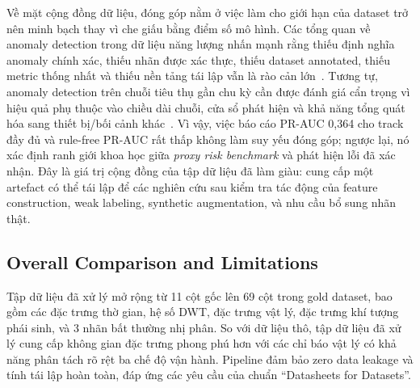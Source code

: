 \documentclass[conference]{IEEEtran}
\begin{document}
Về mặt cộng đồng dữ liệu, đóng góp nằm ở việc làm cho giới hạn của dataset trở nên minh bạch thay vì che giấu bằng điểm số mô hình. Các tổng quan về anomaly detection trong dữ liệu năng lượng nhấn mạnh rằng thiếu định nghĩa anomaly chính xác, thiếu nhãn được xác thực, thiếu dataset annotated, thiếu metric thống nhất và thiếu nền tảng tái lập vẫn là rào cản lớn~\cite{himeur2021review}. Tương tự, anomaly detection trên chuỗi tiêu thụ gần chu kỳ cần được đánh giá cẩn trọng vì hiệu quả phụ thuộc vào chiều dài chuỗi, cửa sổ phát hiện và khả năng tổng quát hóa sang thiết bị/bối cảnh khác~\cite{zangrando2022quasi}. Vì vậy, việc báo cáo PR-AUC 0,364 cho track đầy đủ và rule-free PR-AUC rất thấp không làm suy yếu đóng góp; ngược lại, nó xác định ranh giới khoa học giữa \textit{proxy risk benchmark} và phát hiện lỗi đã xác nhận. Đây là giá trị cộng đồng của tập dữ liệu đã làm giàu: cung cấp một artefact có thể tái lập để các nghiên cứu sau kiểm tra tác động của feature construction, weak labeling, synthetic augmentation, và nhu cầu bổ sung nhãn thật.

\subsection{Overall Comparison and Limitations}

Tập dữ liệu đã xử lý mở rộng từ 11 cột gốc lên 69 cột trong gold dataset,
bao gồm các đặc trưng thờ gian, hệ số DWT, đặc trưng vật lý, đặc trưng khí tượng phái sinh,
và 3 nhãn bất thường nhị phân.
So với dữ liệu thô, tập dữ liệu đã xử lý cung cấp không gian đặc trưng phong phú hơn
với các chỉ báo vật lý có khả năng phân tách rõ rệt ba chế độ vận hành.
Pipeline đảm bảo zero data leakage và tính tái lập hoàn toàn,
đáp ứng các yêu cầu của chuẩn ``Datasheets for Datasets''.
\end{document}

